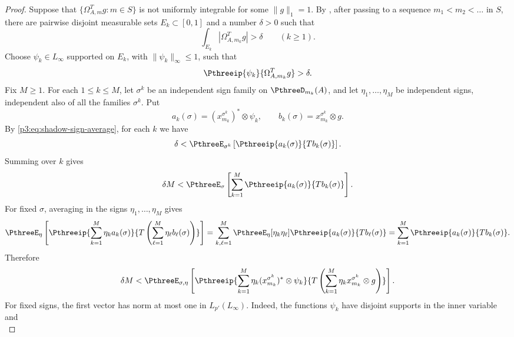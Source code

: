 \documentclass[11pt,reqno]{amsart}
\makeatletter
\theoremstyle{plain}
\theoremstyle{definition}
\newcounter{problempaper}
\newenvironment{problempaperbody}{%
  \setcounter{subsection}{0}%
  \setcounter{subsubsection}{0}%
  \setcounter{paragraph}{0}%
  \renewcommand{\thesubsection}{\arabic{subsection}}%
  \renewcommand{\thesubsubsection}{\thesubsection.\arabic{subsubsection}}%
  \renewcommand{\theparagraph}{\thesubsubsection.\arabic{paragraph}}%
  \let\problem@outersection\section
  \let\problem@outersubsection\subsection
  \let\problem@outersubsubsection\subsubsection
  \let\problem@outerparagraph\paragraph
  \let\section\problem@papersection
  \let\subsection\problem@papersubsection
  \let\subsubsection\problem@papersubsubsection
}{%
  \let\section\problem@outersection
  \let\subsection\problem@outersubsection
  \let\subsubsection\problem@outersubsubsection
  \let\paragraph\problem@outerparagraph
}
\newcommand{\problem@target}[2]{%
  \hypertarget{problem-\theproblempaper-#1-#2}{}%
}
\newcommand{\problem@paperheading}[3]{%
  \par\bigskip
  \problem@target{#1}{#2}%
  \noindent{\large\bfseries #2.\quad #3\par}%
  \nobreak\smallskip
}
\newcommand{\problem@papersubheading}[3]{%
  \par\medskip
  \problem@target{#1}{#2}%
  \noindent{\normalsize\bfseries #2.\quad #3\par}%
  \nobreak\smallskip
}
\newcommand{\problem@papersubsubheading}[3]{%
  \par\smallskip
  \problem@target{#1}{#2}%
  \noindent{\normalsize\itshape #2.\quad #3.\ }%
}
\def\problem@papersection{%
  \@ifstar{\problem@papersectionstar}{\problem@papersectionnostar}%
}
\def\problem@papersectionstar#1{%
  \par\bigskip\noindent{\large\bfseries #1\par}\nobreak\smallskip
}
\def\problem@papersectionnostar#1{%
  \refstepcounter{subsection}%
  \setcounter{subsubsection}{0}%
  \setcounter{paragraph}{0}%
  \problem@paperheading{section}{\thesubsection}{#1}%
  \problem@writecontentsline{section}{\thesubsection}{#1}%
}
\def\problem@papersubsection{%
  \@ifstar{\problem@papersubsectionstar}{\problem@papersubsectionnostar}%
}
\def\problem@papersubsectionstar#1{%
  \par\medskip\noindent{\normalsize\bfseries #1\par}\nobreak\smallskip
}
\def\problem@papersubsectionnostar#1{%
  \refstepcounter{subsubsection}%
  \setcounter{paragraph}{0}%
  \problem@papersubheading{subsection}{\thesubsubsection}{#1}%
  \problem@writecontentsline{subsection}{\thesubsubsection}{#1}%
}
\def\problem@papersubsubsection{%
  \@ifstar{\problem@papersubsubsectionstar}{\problem@papersubsubsectionnostar}%
}
\def\problem@papersubsubsectionstar#1{%
  \par\smallskip\noindent{\normalsize\itshape #1.\ }%
}
\def\problem@papersubsubsectionnostar#1{%
  \refstepcounter{paragraph}%
  \problem@papersubsubheading{subsubsection}{\theparagraph}{#1}%
  \problem@writecontentsline{subsubsection}{\theparagraph}{#1}%
}
\newcommand{\problem@writecontentsline}[3]{%
  \begingroup
  \protected@write\@auxout{}{%
    \string\problemcontentsentry{\theproblempaper}{#1}{#2}{#3}{\thepage}%
  }%
  \endgroup
}
\newcommand{\problemcontentsentry}[5]{%
  \@ifundefined{problemcontents@#1}{%
    \expandafter\gdef\csname problemcontents@#1\endcsname{}%
  }{}%
  \expandafter\g@addto@macro\csname problemcontents@#1\endcsname{%
    \problemcontentsline{#1}{#2}{#3}{#4}{#5}%
  }%
}
\newcommand{\problemcontentslink}[4]{%
  \hyperlink{problem-#1-#2-#3}{#4}%
}
\newcommand{\problemcontentsline}[5]{%
  \ifstrequal{#2}{section}{%
    \par\noindent
    \problemcontentslink{#1}{#2}{#3}{\makebox[2.5em][l]{#3}#4}%
    \nobreak\dotfill
    \problemcontentslink{#1}{#2}{#3}{#5}\par
  }{%
    \ifstrequal{#2}{subsection}{%
      \par\noindent\hspace*{1.5em}%
      \problemcontentslink{#1}{#2}{#3}{\makebox[3.5em][l]{#3}#4}%
      \nobreak\dotfill
      \problemcontentslink{#1}{#2}{#3}{#5}\par
    }{%
      \par\noindent\hspace*{3em}%
      \problemcontentslink{#1}{#2}{#3}{\makebox[4.5em][l]{#3}#4}%
      \nobreak\dotfill
      \problemcontentslink{#1}{#2}{#3}{#5}\par
    }%
  }%
}
\makeatother
\begin{document}
\begin{problempaperbody}
\begin{proof}
Suppose that $\{\Omega_{A,m}^Tg:m\in S\}$ is not uniformly integrable for some $\|g\|_1=1$. By , after passing to a sequence $m_1<m_2<\ldots$ in $S$, there are pairwise disjoint measurable sets $E_k\subset[0,1]$ and a number $\delta>0$ such that
\begin{equation*}
        \int_{E_k}|\Omega_{A,m_k}^Tg|>\delta\qquad(k\geq1).
\end{equation*}
Choose $\psi_k\in L_\infty$ supported on $E_k$, with $\|\psi_k\|_\infty\leq1$, such that
\begin{equation*}
        \Pthreeip{\psi_k}{\Omega_{A,m_k}^Tg}>\delta.
\end{equation*}
Fix $M\geq 1$. For each $1\leq k\leq M$, let $\sigma^k$ be an independent sign family on $\PthreeD_{m_k}(A)$, and let $\eta_1,\ldots,\eta_M$ be independent signs, independent also of all the families $\sigma^k$. Put
\begin{equation*}
        a_k(\sigma)=(x_{m_k}^{\sigma^k})^*\otimes\psi_k,\qquad b_k(\sigma)=x_{m_k}^{\sigma^k}\otimes g.
\end{equation*}
By \eqref{p3:eq:shadow-sign-average}, for each $k$ we have
\begin{equation*}
        \delta<\PthreeE_{\sigma^k}\left[\Pthreeip{a_k(\sigma)}{Tb_k(\sigma)}\right].
\end{equation*}
Summing over $k$ gives
\begin{equation*}
        \delta M<\PthreeE_\sigma\left[\sum_{k=1}^M\Pthreeip{a_k(\sigma)}{Tb_k(\sigma)}\right].
\end{equation*}
For fixed $\sigma$, averaging in the signs $\eta_1,\ldots,\eta_M$ gives
\begin{equation*}
        \PthreeE_\eta\left[\Pthreeip{\sum_{k=1}^M\eta_ka_k(\sigma)}{T\left(\sum_{\ell=1}^M\eta_\ell b_\ell(\sigma)\right)}\right]=\sum_{k,\ell=1}^M\PthreeE_\eta[\eta_k\eta_\ell]\Pthreeip{a_k(\sigma)}{Tb_\ell(\sigma)}=\sum_{k=1}^M\Pthreeip{a_k(\sigma)}{Tb_k(\sigma)}.
\end{equation*}
Therefore
\begin{equation*}
        \delta M<\PthreeE_{\sigma,\eta}\left[\Pthreeip{\sum_{k=1}^M\eta_k(x_{m_k}^{\sigma^k})^*\otimes\psi_k}{T\left(\sum_{k=1}^M\eta_kx_{m_k}^{\sigma^k}\otimes g\right)}\right].
\end{equation*}
For fixed signs, the first vector has norm at most one in $L_{p'}(L_\infty)$. Indeed, the functions $\psi_k$ have disjoint supports in the inner variable and
\begin{equation*}

\end{equation*}
\end{proof}
\end{problempaperbody}
\end{document}
